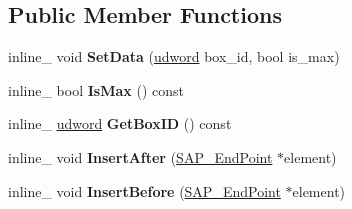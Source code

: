 \subsection*{Public Member Functions}
\begin{DoxyCompactItemize}
\item 
inline\+\_\+ void {\bfseries Set\+Data} (\hyperlink{IceTypes_8h_a44c6f1920ba5551225fb534f9d1a1733}{udword} box\+\_\+id, bool is\+\_\+max)\hypertarget{classOpcode_1_1SAP__EndPoint_aa124b8b4cf1e72c3659640cf8e03536b}{}\label{classOpcode_1_1SAP__EndPoint_aa124b8b4cf1e72c3659640cf8e03536b}

\item 
inline\+\_\+ bool {\bfseries Is\+Max} () const \hypertarget{classOpcode_1_1SAP__EndPoint_a12e319047f703d08b1a36536442f3727}{}\label{classOpcode_1_1SAP__EndPoint_a12e319047f703d08b1a36536442f3727}

\item 
inline\+\_\+ \hyperlink{IceTypes_8h_a44c6f1920ba5551225fb534f9d1a1733}{udword} {\bfseries Get\+Box\+ID} () const \hypertarget{classOpcode_1_1SAP__EndPoint_a6bb9c12e143d0a3b39a6e6d6033c6330}{}\label{classOpcode_1_1SAP__EndPoint_a6bb9c12e143d0a3b39a6e6d6033c6330}

\item 
inline\+\_\+ void {\bfseries Insert\+After} (\hyperlink{classOpcode_1_1SAP__EndPoint}{S\+A\+P\+\_\+\+End\+Point} $\ast$element)\hypertarget{classOpcode_1_1SAP__EndPoint_a766544b335f5652a3a2c3049366ca5b9}{}\label{classOpcode_1_1SAP__EndPoint_a766544b335f5652a3a2c3049366ca5b9}

\item 
inline\+\_\+ void {\bfseries Insert\+Before} (\hyperlink{classOpcode_1_1SAP__EndPoint}{S\+A\+P\+\_\+\+End\+Point} $\ast$element)\hypertarget{classOpcode_1_1SAP__EndPoint_a6249ee4f220e7eb4d81829054537ffc0}{}\label{classOpcode_1_1SAP__EndPoint_a6249ee4f220e7eb4d81829054537ffc0}

\end{DoxyCompactItemize}
